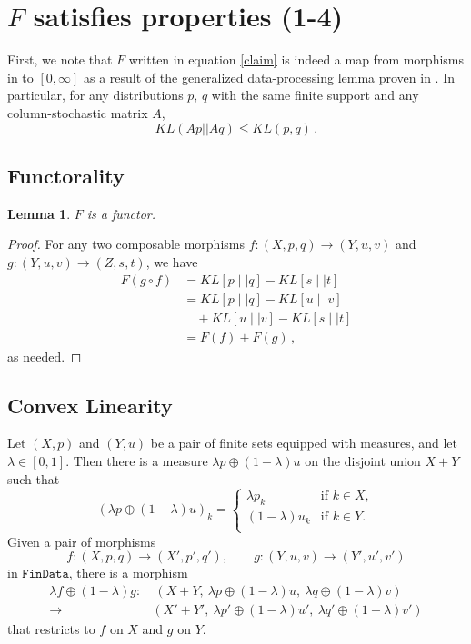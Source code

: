 \documentclass{article}
\newtheorem{lemma}{Lemma}
\begin{document}
{\section{$F$ satisfies properties (1-4)}
First, we note that $F$ written in equation \eqref{claim} is indeed a map from morphisms in  to $[0, \infty]$ as a result of the generalized data-processing lemma proven in \cite{cohenRelativeEntropyMappings1993}. In particular, for any distributions $p$, $q$ with the same finite support and any column-stochastic matrix $A$, 
$$
    KL(Ap || Aq) \leq KL(p, q)\,.
$$

\subsection{Functorality}
\begin{lemma}
$F$ is a functor.
\end{lemma}

\begin{proof}
For any two composable morphisms $f:(X, p, q) \rightarrow (Y, u, v)$ and $g:(Y, u, v) \rightarrow (Z, s, t)$, we have 
\begin{align*}
  F(g \circ f) &= KL[p \mid\mid q] - KL[s \mid\mid t]\\
  &= KL[p \mid\mid q] - KL[u \mid\mid v] \\
  &\quad + KL[u \mid\mid v] - KL[s \mid\mid t] \\
  &= F(f) + F(g)\,,
\end{align*}
as needed.
\end{proof}


\subsection{Convex Linearity}
Let $(X, p)$ and $(Y, u)$ be a pair of finite sets equipped with measures, and let $\lambda \in [0,1]$. Then there is a measure $\lambda p \oplus (1-\lambda)u$ on the disjoint union $X + Y$ such that
$$
  (\lambda p \oplus (1-\lambda)u)_k = \begin{cases}
    \lambda p_k &\text{if } k\in X,\\
    (1-\lambda) u_k &\text{if } k\in Y.\\
  \end{cases}
$$
Given a pair of morphisms
$$
f:(X, p, q) \rightarrow (X', p', q'), \qquad g:(Y, u, v) \rightarrow (Y', u', v')
$$
in $\texttt{FinData}$, there is a  morphism
\begin{align*}
\lambda f \oplus (1-\lambda) g:
&\ (X + Y, \ \lambda p \oplus (1-\lambda)u, \ \lambda q \oplus (1-\lambda)v)\\ \rightarrow& (X' + Y', \ \lambda p' \oplus (1-\lambda)u', \ \lambda q' \oplus (1-\lambda)v')
\end{align*}
that restricts to $f$ on $X$ and $g$ on $Y$.

}
\end{document}
